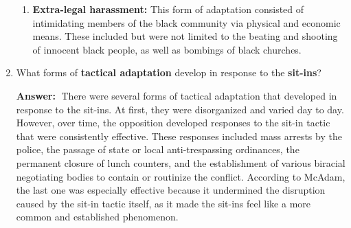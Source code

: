 \documentclass{article}
\newcommand{\answer}{\textbf{Answer:}$\;$}
\begin{document}
\begin{enumerate}[label=\arabic*)]
\begin{enumerate}
        \item \textbf{Extra-legal harassment:}
        This form of adaptation consisted of intimidating members of the black community via physical and economic means.
        These included but were not limited to the beating and shooting of innocent black people, as well as bombings of black churches.
    \end{enumerate}

    \item What forms of \textbf{tactical adaptation} develop in response to the \textbf{sit-ins}?

    \answer
    There were several forms of tactical adaptation that developed in response to the sit-ins.
    At first, they were disorganized and varied day to day. 
    However, over time, the opposition developed responses to the sit-in tactic that were consistently effective.
    These responses included mass arrests by the police, the passage of state or local anti-trespassing ordinances, the permanent closure of lunch counters, and the establishment of various biracial negotiating bodies to contain or routinize the conflict.
    According to McAdam, the last one was especially effective because it undermined the disruption caused by the sit-in tactic itself, as it made the sit-ins feel like a more common and established phenomenon.

    
\end{enumerate}
 
\end{document}
